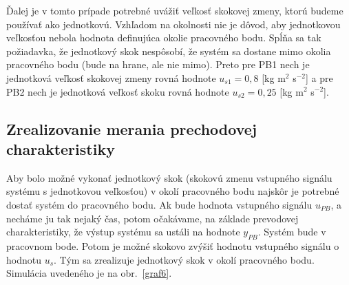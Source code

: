 \documentclass[a4paper, 10pt, ]{article}
\begin{document}
\begin{figure}[t]
	\centering


    \vspace{-4mm}

	\caption{}
	\label{Prevodová charakteristika graf5}

\end{figure}




Ďalej je v tomto prípade potrebné uvážiť veľkosť skokovej zmeny, ktorú budeme používať ako jednotkovú. Vzhľadom na okolnosti nie je dôvod, aby jednotkovou veľkosťou nebola hodnota definujúca okolie pracovného bodu. Spĺňa sa tak požiadavka, že jednotkový skok nespôsobí, že systém sa dostane mimo okolia pracovného bodu (bude na hrane, ale nie mimo). Preto pre PB1 nech je jednotková veľkosť skokovej zmeny rovná hodnote $u_{s1} = 0,8$ [kg m$^2$ s$^{-2}$] a pre PB2 nech je jednotková veľkosť skoku rovná hodnote $u_{s2} = 0,25$ [kg m$^2$ s$^{-2}$].






\subsection{Zrealizovanie merania prechodovej charakteristiky}


Aby bolo možné vykonať jednotkový skok (skokovú zmenu vstupného signálu systému s jednotkovou veľkosťou) v okolí pracovného bodu najskôr je potrebné dostať systém do pracovného bodu. Ak bude hodnota vstupného signálu $u_{PB}$, a necháme ju tak nejaký čas, potom očakávame, na základe prevodovej charakteristiky, že výstup systému sa ustáli na hodnote $y_{PB}$. Systém bude v pracovnom bode. Potom je možné skokovo zvýšiť hodnotu vstupného signálu o hodnotu $u_{s}$. Tým sa zrealizuje jednotkový skok v okolí pracovného bodu. Simulácia uvedeného je na obr.~\ref{graf6}.
\end{document}

